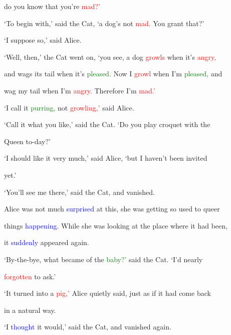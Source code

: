  do you know that you’re \textcolor{red}{mad?’}



 ‘To begin with,’ said the Cat, ‘a dog’s not \textcolor{red}{mad.} You \textcolor{BurntOrange}{grant} that?’



 ‘I suppose so,’ said Alice.



 ‘Well, then,’ the Cat went on, ‘you see, a dog \textcolor{red}{growls} when it’s \textcolor{red}{angry,}

 and wags its tail when it’s \textcolor{green}{pleased.} Now I \textcolor{red}{growl} when I’m \textcolor{green}{pleased,} and

 wag my tail when I’m \textcolor{red}{angry.} Therefore I’m \textcolor{red}{mad.’}



 ‘I call it \textcolor{green}{purring,} not \textcolor{red}{growling,’} said Alice.



 ‘Call it what you like,’ said the Cat. ‘Do you play croquet with the

 Queen to-day?’



 ‘I should like it very much,’ said Alice, ‘but I haven’t been \textcolor{BurntOrange}{invited}

 yet.’



 ‘You’ll see me there,’ said the Cat, and \textcolor{BurntOrange}{vanished.}



 Alice was not much \textcolor{blue}{surprised} at this, she was getting so used to queer

 things \textcolor{blue}{happening.} While she was looking at the place where it had been,

 it \textcolor{blue}{suddenly} appeared again.



 ‘By-the-bye, what became of the \textcolor{green}{baby?’} said the Cat. ‘I’d nearly

 \textcolor{red}{forgotten} to ask.’



 ‘It turned into a \textcolor{red}{pig,’} Alice quietly said, just as if it had come back

 in a natural way.



 ‘I \textcolor{blue}{thought} it would,’ said the Cat, and \textcolor{BurntOrange}{vanished} again.



